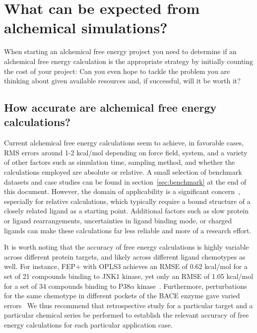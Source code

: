 \documentclass[9pt,bestpractices]{livecoms}
\begin{document}
\section{What can be expected from alchemical simulations?}
\label{sec:step0}


When starting an alchemical free energy project you need to determine if an alchemical free energy calculation is the appropriate strategy by initially counting the cost of your
project: Can you even hope to tackle the problem you are thinking
about given available resources and, if successful, will it
be worth it?
\subsection*{How accurate are alchemical free energy calculations?}

Current alchemical free energy calculations seem to achieve, in favorable cases, RMS errors around 1-2 kcal/mol depending on force field, system, and a variety of other factors such as simulation time, sampling method, and whether the calculations employed are absolute or relative. A small selection of benchmark datasets and case studies can be found in section~\ref{sec:benchmark} at the end of this document.
However, the domain of applicability is a significant concern~\cite{sherborne2016collaborating, cournia2017relative}, especially for relative calculations, which typically require a bound structure of a closely
related ligand as a starting point. Additional factors such as slow protein or ligand rearrangements, uncertainties in ligand binding mode, or charged ligands can make these calculations far less reliable and more of a research effort.

It is worth noting that the accuracy of free energy calculations is highly variable across different protein targets, and likely across different ligand chemotypes as well. For instance, FEP+ with OPLS3 achieves an RMSE of 0.62 kcal/mol for a set of 21 compounds binding to JNK1 kinase, yet only an RMSE of 1.05 kcal/mol for a set of 34 compounds binding to P38$\alpha$ kinase~\cite{harder2016opls3}. Furthermore, perturbations for the same chemotype in different pockets of the BACE enzyme gave varied errors~\cite{keranen2017acylguanidine}
We thus recommend that retrospective study for a particular target and a particular chemical series be performed to establish the relevant accuracy of free energy calculations for each particular application case.
%
\end{document}
